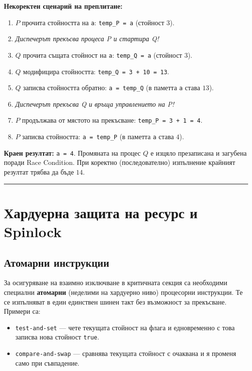 \documentclass{scrartcl}
\begin{document}
\begin{FlushLeft}
\textbf{Некоректен сценарий на преплитане:}
\begin{enumerate}
    \item $P$ прочита стойността на \lstinline|a|: \lstinline|temp_P = a| (стойност $3$).
    \item \textit{Диспечерът прекъсва процеса P и стартира Q!}
    \item $Q$ прочита същата стойност на \lstinline|a|: \lstinline|temp_Q = a| (стойност $3$).
    \item $Q$ модифицира стойността: \lstinline|temp_Q = 3 + 10 = 13|.
    \item $Q$ записва стойността обратно: \lstinline|a = temp_Q| (в паметта \lstinline|a| става $13$).
    \item \textit{Диспечерът прекъсва Q и връща управлението на P!}
    \item $P$ продължава от мястото на прекъсване: \lstinline|temp_P = 3 + 1 = 4|.
    \item $P$ записва стойността: \lstinline|a = temp_P| (в паметта \lstinline|a| става $4$).
\end{enumerate}
\textbf{Краен резултат:} \lstinline|a = 4|. Промяната на процес $Q$ е изцяло презаписана и загубена поради Race Condition. При коректно (последователно) изпълнение крайният резултат трябва да бъде $14$.

\noindent\rule{\linewidth}{0.4pt}

\section{Хардуерна защита на ресурс и Spinlock}

\subsection{Атомарни инструкции}
За осигуряване на взаимно изключване в критичната секция са необходими специални \textbf{атомарни} (неделими на хардуерно ниво) процесорни инструкции. Те се изпълняват в един единствен шинен такт без възможност за прекъсване. Примери са:
\begin{itemize}
    \item \lstinline|test-and-set| --- чете текущата стойност на флага и едновременно с това записва нова стойност \lstinline|true|.
    \item \lstinline|compare-and-swap| --- сравнява текущата стойност с очаквана и я променя само при съвпадение.
\end{itemize}


\end{FlushLeft}
\end{document}

